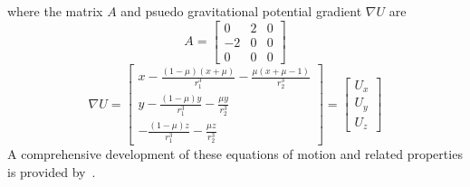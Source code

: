 where the matrix \( A \) and psuedo gravitational potential gradient \( \nabla U\) are
\begin{equation}\label{eq:A_mat}
	A = \left[ \begin{array}{ccc} 0 & 2 & 0 \\ -2 & 0 & 0 \\ 0 & 0 & 0 \end{array} \right]
\end{equation}
\begin{equation} \label{eq:grav_pot}
	\nabla U = \left[ \begin{array}{c} x - \frac{ \left(1 - \mu\right) \left(x + \mu\right)}{r_1^3} - \frac{\mu \left( x+ \mu -1\right)}{r_2^3} \\
											y - \frac{ \left(1 - \mu\right) y}{r_1^3} - \frac{\mu y}{r_2^3} \\
											- \frac{ \left(1 - \mu\right) z}{r_1^3} - \frac{\mu z}{r_2^3}\end{array}\right]
					= \left[\begin{array}{c} U_x \\ U_y \\ U_z\end{array} \right]
\end{equation}
A comprehensive development of these equations of motion and related properties is provided by~\cite{szebehely1967}.
